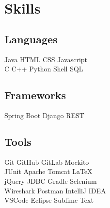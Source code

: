 \documentclass[]{deedy-resume-openfont}
\begin{document}
%
%
\lastupdated

%
%

%
%

\begin{minipage}[t]{0.33\textwidth} 


\section{Skills}
\subsection{Languages}
Java \textbullet{} HTML \textbullet{} CSS \textbullet{} Javascript \\
\textbullet{} C \textbullet{} C++ \textbullet{} Python 
\textbullet{} Shell \textbullet{} SQL \\

\subsection{Frameworks}
Spring Boot \textbullet{} Django REST\\

\subsection{Tools}
Git \textbullet{} GitHub  \textbullet{} GitLab  \textbullet{} Mockito \\ \textbullet{} JUnit \textbullet{} Apache Tomcat  \textbullet{} LaTeX \\ \textbullet{} jQuery \textbullet{} JDBC \textbullet{} Gradle \textbullet{} Selenium \\ \textbullet{} Wireshark \textbullet{} Postman\textbullet{} IntelliJ IDEA \\ \textbullet{} VSCode  \textbullet{} Eclipse \textbullet{} Sublime Text
\sectionsep


\end{minipage}
\end{document}
